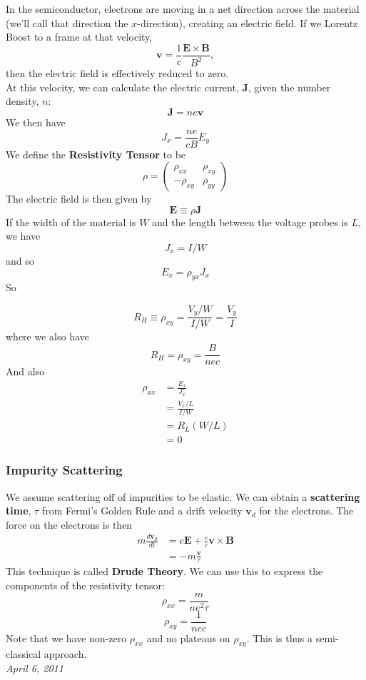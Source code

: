 \documentclass{article}
\begin{document}
	In the semiconductor, electrons are moving in a net direction across the material (we'll call that direction the $x$-direction), creating an electric field. If we Lorentz Boost to a frame at that velocity, 
	$$\mathbf{v}=\frac{1}{c}\frac{\mathbf{E}\times\mathbf{B}}{B^2},$$
	then the electric field is effectively reduced to zero. \\
	
	\noindent At this velocity, we can calculate the electric current, $\mathbf{J}$, given the number density, $n$:
	$$\mathbf{J}=ne\mathbf{v}$$
	We then have
	$$J_x=\frac{ne}{cB}E_y$$
	We define the \textbf{Resistivity Tensor} to be
	$$\rho=\begin{pmatrix} \rho_{xx} & \rho_{xy}\\ -\rho_{xy} & \rho_{yy} \end{pmatrix}$$
	The electric field is then given by
	$$\mathbf{E}\equiv \rho \mathbf{J}$$
	If the width of the material is $W$ and the length between the voltage probes is $L$, we have
	$$J_x=I/W$$
	and so $$E_x=\rho_{yx} J_x$$
	So 
	
	$$R_H\equiv \rho_{xy}=\frac{V_y/W}{I/W}=\frac{V_y}{I}$$
	where we also have 
	$$R_H=\rho_{xy}=\frac{B}{nec}$$
	And also
	\begin{align*}
		\rho_{xx}&=\frac{E_x}{J_x}\\
		&=\frac{V_x/L}{I/W}\\
		&=R_L(W/L)\\
		&=0
	\end{align*}	
	\subsubsection{Impurity Scattering}
	We assume scattering off of impurities to be elastic. We can obtain a \textbf{scattering time}, $\tau$ from Fermi's Golden Rule and a drift velocity $\mathbf{v}_d$ for the electrons. The force on the electrons is then
	\begin{align*}
		m\frac{d\mathbf{v}_d}{dt}&=e\mathbf{E}+\frac{e}{c}\mathbf{v}\times \mathbf{B}\\
		&=-m\frac{\mathbf{v}}{\tau}
	\end{align*}
	This technique is called \textbf{Drude Theory}. We can use this to express the components of the resistivity tensor:
	$$\rho_{xx}=\frac{m}{ne^2\tau}$$
	$$\rho_{xy}=\frac{1}{nec}$$
	Note that we have non-zero $\rho_{xx}$ and no plateaus on $\rho_{xy}$. This is thus a semi-classical approach.	\\
	
	\noindent\textit{April 6, 2011}
\end{document}
